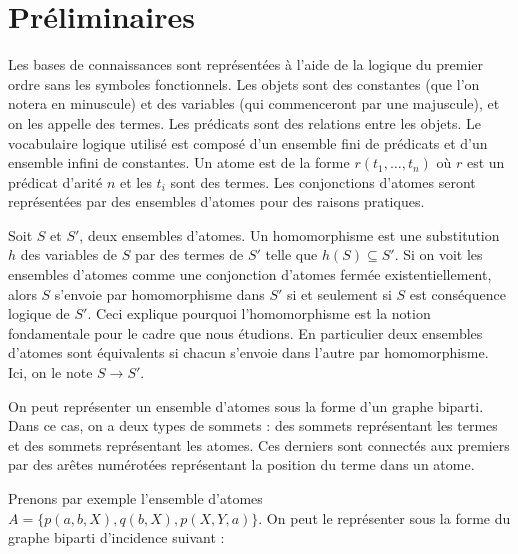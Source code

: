 \section{Préliminaires}\label{sec:preliminaires}

Les bases de connaissances sont représentées à l'aide de la logique du premier ordre sans les symboles fonctionnels. Les objets sont des constantes (que l'on notera en minuscule) et des variables (qui commenceront par une majuscule), et on les appelle des termes. Les prédicats sont des relations entre les objets. Le vocabulaire logique utilisé est composé d'un ensemble fini de prédicats et d'un ensemble infini de constantes. Un atome est de la forme $r(t_1, \ldots, t_n)$ où $r$ est un prédicat d'arité $n$ et les $t_i$ sont des termes. Les conjonctions d'atomes seront représentées par des ensembles d'atomes pour des raisons pratiques.

\begin{definition} Soit $S$ et $S'$, deux ensembles d'atomes. Un homomorphisme est une substitution $h$ des variables de $S$ par des termes de $S'$ telle que $h(S) \subseteq S'$.
Si on voit les ensembles d'atomes comme une conjonction d'atomes fermée existentiellement, alors $S$ s'envoie par homomorphisme dans $S'$ si et seulement si $S$ est conséquence logique de $S'$. Ceci explique pourquoi l'homomorphisme est la notion fondamentale pour le cadre que nous étudions. En particulier deux ensembles d'atomes sont équivalents si chacun s'envoie dans l'autre par homomorphisme. Ici, on le note $S \rightarrow S'$.
\end{definition}

On peut représenter un ensemble d'atomes sous la forme d'un graphe biparti. Dans ce cas, on a deux types de sommets : des sommets représentant les termes et des sommets représentant les atomes. Ces derniers sont connectés aux premiers par des arêtes numérotées représentant la position du terme dans un atome.
\par Prenons par exemple l'ensemble d'atomes $A = \{p(a,b,X), q(b,X), p(X,Y,a)\}$. On peut le représenter sous la forme du graphe biparti d'incidence suivant : \par

